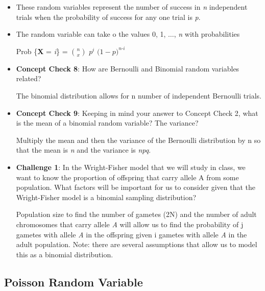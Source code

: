 \documentclass[12pt]{report}
\begin{document}
\begin{itemize}

\item These random variables represent the number of success in \textit{n} independent trials when the probability of success for any one trial is \textit{p}. 

\item The random variable can take o the values 0, 1, $\ldots$, \textit{n} with probabilities

Prob \{\textbf{X} = \textit{i}\} = ${n \choose x}$ \textit{$p^{i}$} $\big( 1- \textit{p} \big)^{\textit{n-i}}$

\item \textbf{Concept Check 8}: How are Bernoulli and Binomial random variables related?

\color{red} The binomial distribution allows for n number of independent Bernoulli trials.

\color{black}

\item \textbf{Concept Check 9}: Keeping in mind your answer to Concept Check 2, what is the mean of a binomial random variable? The variance?

\color{red} Multiply the mean and then the variance of the Bernoulli distribution by n so that the mean is \textit{n} and the variance is \textit{npq}. 

\color{black}

\item \textbf{Challenge 1}: In the Wright-Fisher model that we will study in class, we want to know the proportion of offspring that carry allele A from some population. What factors will be important for us to consider given that the Wright-Fisher model is a binomial sampling distribution?

\color{red} Population size to find the number of gametes (2N) and the number of adult chromosomes that carry allele \textit{A} will allow us to find the probability of j gametes with allele \textit{A} in the offspring given i gametes with allele \textit{A} in the adult population. Note: there are several assumptions that allow us to model this as a binomial distribution.


\color{black}

\end{itemize}

\subsection{Poisson Random Variable}
\end{document}
